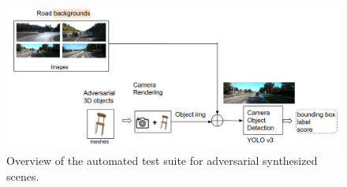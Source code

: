 \begin{figure}
	\centering
	\includegraphics[width=1\linewidth]{figure/test-attack.png}
	\caption{Overview of the automated test suite for adversarial synthesized scenes.}
	\label{fig:test-att}
\end{figure}



